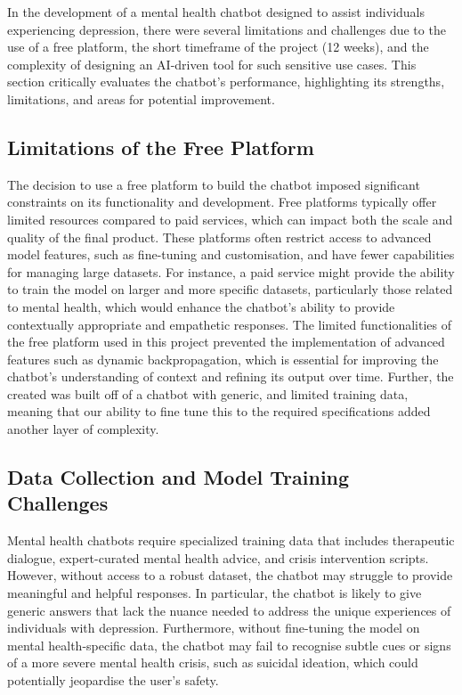 In the development of a mental health chatbot designed to assist individuals experiencing depression, there were several limitations and challenges due to the use of a free platform, the short timeframe of the project (12 weeks), and the complexity of designing an AI-driven tool for such sensitive use cases. This section critically evaluates the chatbot’s performance, highlighting its strengths, limitations, and areas for potential improvement.
\subsection*{Limitations of the Free Platform} 
The decision to use a free platform to build the chatbot imposed significant constraints on its functionality and development. Free platforms typically offer limited resources compared to paid services, which can impact both the scale and quality of the final product. These platforms often restrict access to advanced model features, such as fine-tuning and customisation, and have fewer capabilities for managing large datasets.
For instance, a paid service might provide the ability to train the model on larger and more specific datasets, particularly those related to mental health, which would enhance the chatbot’s ability to provide contextually appropriate and empathetic responses. The limited functionalities of the free platform used in this project prevented the implementation of advanced features such as dynamic backpropagation, which is essential for improving the chatbot’s understanding of context and refining its output over time. Further, the created was built off of a chatbot with generic, and limited training data, meaning that our ability to fine tune this to the required specifications added another layer of complexity.
\subsection*{Data Collection and Model Training Challenges} 
Mental health chatbots require specialized training data that includes therapeutic dialogue, expert-curated mental health advice, and crisis intervention scripts. However, without access to a robust dataset, the chatbot may struggle to provide meaningful and helpful responses. In particular, the chatbot is likely to give generic answers that lack the nuance needed to address the unique experiences of individuals with depression. Furthermore, without fine-tuning the model on mental health-specific data, the chatbot may fail to recognise subtle cues or signs of a more severe mental health crisis, such as suicidal ideation, which could potentially jeopardise the user’s safety.
